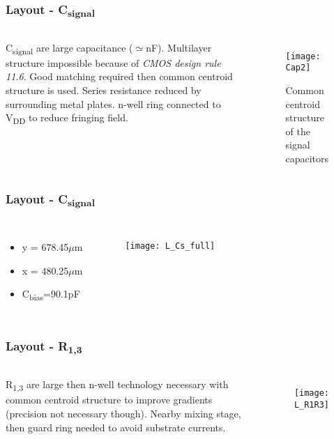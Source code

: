 \begin{frame}
\frametitle{Layout - C\textsubscript{signal}}
\begin{columns}
	C\textsubscript{signal} are large capacitance ($\simeq$nF). Multilayer structure impossible because of \emph{CMOS design rule 11.6}. Good matching required  then common centroid structure is used. Series resistance reduced by surrounding metal plates. n-well ring connected to V\textsubscript{DD} to reduce fringing field.
	
	\begin{figure}[H]
		\centering
		\texttt{[image: Cap2]}
		\caption{Common centroid structure of the signal capacitors}
		\label{Cap2}
	\end{figure}
\end{columns}
\end{frame}

\begin{frame}
	\frametitle{Layout - C\textsubscript{signal}}
	\begin{columns}
	\begin{itemize}
		\item y = 678.45$\mu$m
		\item x = 480.25$\mu$m
		\item C\textsubscript{bias}=90.1pF
	\end{itemize}
	\begin{figure}[H]
		\centering
		\texttt{[image: L\_Cs\_full]}
		\label{L_Cs_full}
	\end{figure}
	\end{columns}
\end{frame}

\begin{frame}
\frametitle{Layout - R\textsubscript{1,3}}
\begin{columns}
	\column{0.5\textwidth}
	R\textsubscript{1,3} are large then n-well technology necessary with common centroid structure to improve gradients (precision not necessary though). Nearby mixing stage, then guard ring needed to avoid substrate currents.
	\column{0.5\textwidth}
	\begin{figure}[H]
		\centering
		\texttt{[image: L\_R1R3]}
		\label{L_R1R3}
	\end{figure}
\end{columns}
\end{frame}

